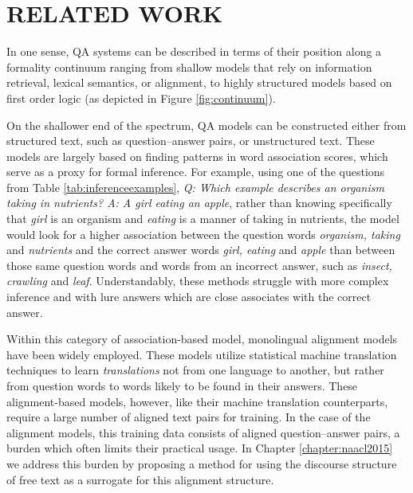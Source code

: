 \chapter{RELATED WORK\label{chapter:related_work}}

In one sense, QA systems can be described in terms of their position along a formality continuum ranging from shallow models that rely on information retrieval, lexical semantics, or alignment, to highly structured models based on first order logic (as depicted in Figure \ref{fig:continuum}).

On the shallower end of the spectrum,  QA models can be constructed either from structured text, such as question--answer pairs, or unstructured text.  These models are largely based on finding patterns in word association scores, which serve as a proxy for formal inference.  For example, using one of the questions from Table \ref{tab:inferenceexamples}, \emph{Q: Which example describes an organism taking in nutrients? A: A girl eating an apple}, rather than knowing specifically that \emph{girl} is an organism and \emph{eating} is a manner of taking in nutrients, the model would look for a higher association between the question words \emph{organism, taking} and \emph{nutrients} and the correct answer words \emph{girl, eating} and \emph{apple} than between those same question words and words from an incorrect answer, such as \emph{insect, crawling} and \emph{leaf}.  Understandably, these methods struggle with more complex inference and with lure answers which are close associates with the correct answer. 

Within this category of association-based model, monolingual alignment models~\citep{Berger:00,echihabi2003noisy,Soricut:06,Riezler:etal:2007,Surdeanu:11,yao2013} have been widely employed.  These models utilize statistical machine translation techniques to learn \textit{translations} not from one language to another, but rather from question words to words likely to be found in their answers.  These alignment-based models, however, like their machine translation counterparts, require a large number of aligned text pairs for training.  In the case of the alignment models, this training data consists of aligned question--answer pairs, a burden which often limits their practical usage.  In Chapter \ref{chapter:naacl2015} we address this burden by proposing a method for using the discourse structure of free text as a surrogate for this alignment structure. %

